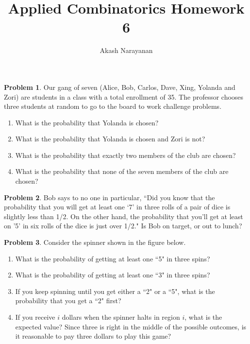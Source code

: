 \documentclass[12pt]{article}
\title{Applied Combinatorics Homework 6}
\author{Akash Narayanan}
\newcounter{chapternumber}
\theoremstyle{definition}
\newtheorem{problem-internal}{Problem}[chapternumber]
\newenvironment{problem}{
  \medskip
  \begin{problem-internal}
}{
\end{problem-internal}
}
\begin{document}
  \maketitle

  \setcounter{chapternumber}{10}
  \begin{problem}
    Our gang of seven (Alice, Bob, Carlos, Dave, Xing, Yolanda and Zori) are students in a class with a total enrollment of 35. The professor chooses three students at random to go to the board to work challenge problems.
    \begin{enumerate}[label={\alph*.}]
      \item What is the probability that Yolanda is chosen?
      \item What is the probability that Yolanda is chosen and Zori is not?
      \item What is the probability that exactly two members of the club are chosen?
      \item What is the probability that none of the seven members of the club are chosen?
    \end{enumerate}
  \end{problem}


  \begin{problem}
    Bob says to no one in particular, ``Did you know that the probability that you will get at least one `7' in three rolls of a pair of dice is slightly less than 1/2. On the other hand, the probability that you'll get at least on '5' in six rolls of the dice is just over 1/2." Is Bob on target, or out to lunch?
  \end{problem}


  \begin{problem}
    Consider the spinner shown in the figure below.
    \begin{enumerate}[label={\alph*.}]
      \item What is the probability of getting at least one ``5" in three spins?
      \item What is the probability of getting at least one ``3" in three spins?
      \item If you keep spinning until you get either a ``2" or a ``5", what is the probability that you get a ``2" first?
      \item If you receive \(i\) dollars when the spinner halts in region \(i\), what is the expected value? Since three is right in the middle of the possible outcomes, is it reasonable to pay three dollars to play this game?
    \end{enumerate}
  \end{problem}
\end{document}
